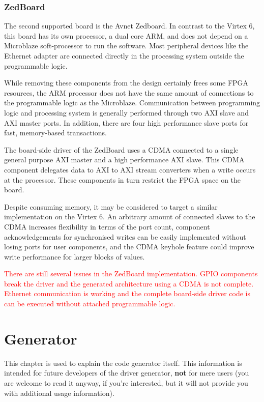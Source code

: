 \documentclass{report}
\begin{document}
\subsection{ZedBoard}
The second supported board is the Avnet Zedboard. In contrast to the Virtex 6, this board has its own processor, a dual core ARM, and does not depend on a Microblaze soft-processor to run the software. Most peripheral devices like the Ethernet adapter are connected directly in the processing system outside the programmable logic.

While removing these components from the design certainly frees some FPGA resources, the ARM processor does not have the same amount of connections to the programmable logic as the Microblaze. Communication between programming logic and processing system is generally performed through two AXI slave and AXI master ports. In addition, there are four high performance slave ports for fast, memory-based transactions.

The board-side driver of the ZedBoard uses a CDMA connected to a single general purpose AXI master and a high performance AXI slave. This CDMA component delegates data to AXI to AXI stream converters when a write occurs at the processor. These components in turn restrict the FPGA space on the board.

Despite consuming memory, it may be considered to target a similar implementation on the Virtex 6. An arbitrary amount of connected slaves to the CDMA increases flexibility in terms of the port count, component acknowledgements for synchronised writes can be easily implemented without losing ports for user components, and the CDMA keyhole feature could improve write performance for larger blocks of values.

\textcolor{red}{There are still several issues in the ZedBoard implementation. GPIO components break the driver and the generated architecture using a CDMA is not complete. Ethernet communication is working and the complete board-side driver code is can be executed without attached programmable logic.}

\chapter{Generator}
This chapter is used to explain the code generator itself. This information is intended for future developers of the driver generator, \textbf{not} for mere users (you are welcome to read it anyway, if you're interested, but it will not provide you with additional usage information).
\end{document}
